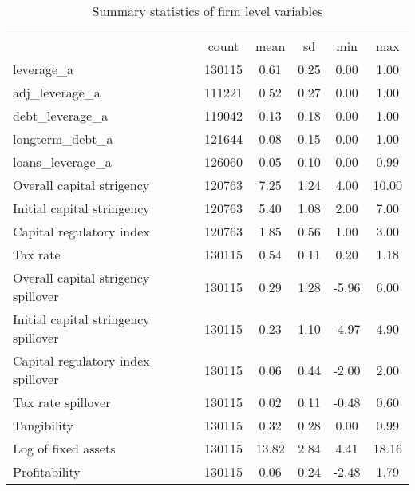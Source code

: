 \begin{table}[htbp]\centering
\def\sym#1{\ifmmode^{#1}\else\(^{#1}\)\fi}
\caption{Summary statistics of firm level variables}
\begin{tabular}{l*{1}{ccccc}}
\hline\hline
                    &\multicolumn{5}{c}{}                                            \\
                    &       count&        mean&          sd&         min&         max\\
\hline
leverage\_a          &      130115&        0.61&        0.25&        0.00&        1.00\\
adj\_leverage\_a      &      111221&        0.52&        0.27&        0.00&        1.00\\
debt\_leverage\_a     &      119042&        0.13&        0.18&        0.00&        1.00\\
longterm\_debt\_a     &      121644&        0.08&        0.15&        0.00&        1.00\\
loans\_leverage\_a    &      126060&        0.05&        0.10&        0.00&        0.99\\
Overall capital strigency&      120763&        7.25&        1.24&        4.00&       10.00\\
Initial capital stringency&      120763&        5.40&        1.08&        2.00&        7.00\\
Capital regulatory index&      120763&        1.85&        0.56&        1.00&        3.00\\
Tax rate            &      130115&        0.54&        0.11&        0.20&        1.18\\
Overall capital strigency spillover&      130115&        0.29&        1.28&       -5.96&        6.00\\
Initial capital stringency spillover&      130115&        0.23&        1.10&       -4.97&        4.90\\
Capital regulatory index spillover&      130115&        0.06&        0.44&       -2.00&        2.00\\
Tax rate spillover  &      130115&        0.02&        0.11&       -0.48&        0.60\\
Tangibility         &      130115&        0.32&        0.28&        0.00&        0.99\\
Log of fixed assets &      130115&       13.82&        2.84&        4.41&       18.16\\
Profitability       &      130115&        0.06&        0.24&       -2.48&        1.79\\

\end{tabular}
\end{table}
